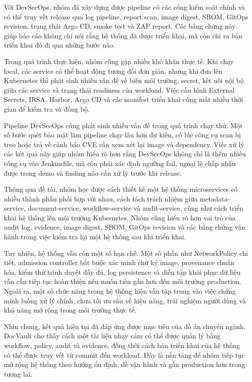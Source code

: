 Với DevSecOps, nhóm đã xây dựng được pipeline có các cổng kiểm soát chính và có thể truy vết release qua log pipeline, report scan, image digest, SBOM, GitOps revision, trạng thái Argo CD, smoke test và ZAP report. Các bằng chứng này giúp báo cáo không chỉ nói rằng hệ thống đã được triển khai, mà còn chỉ ra bản triển khai đó đi qua những bước nào.

Trong quá trình thực hiện, nhóm cũng gặp nhiều khó khăn thực tế. Khi chạy local, các service có thể hoạt động tương đối đơn giản, nhưng khi đưa lên Kubernetes thì phát sinh nhiều vấn đề về biến môi trường, secret, kết nối nội bộ giữa các service và trạng thái readiness của workload. Việc cấu hình External Secrets, IRSA, Harbor, Argo CD và các manifest triển khai cũng mất nhiều thời gian để kiểm tra và đồng bộ.

Pipeline DevSecOps cũng phát sinh nhiều vấn đề trong quá trình chạy thử. Một số bước quét bảo mật làm pipeline chạy lâu hơn dự kiến, có lúc công cụ scan bị treo hoặc trả về cảnh báo CVE cần xem xét lại image và dependency. Việc xử lý các kết quả này giúp nhóm hiểu rõ hơn rằng DevSecOps không chỉ là thêm nhiều công cụ vào Jenkinsfile, mà còn phải xác định ngưỡng fail, ngoại lệ chấp nhận được trong demo và finding nào cần xử lý trước khi release.

Thông qua đề tài, nhóm học được cách thiết kế một hệ thống microservices có nhiều thành phần phối hợp với nhau, cách tách trách nhiệm giữa metadata-service, document-service, workflow-service và audit-service, cũng như cách triển khai hệ thống lên môi trường Kubernetes. Nhóm cũng hiểu rõ hơn vai trò của audit log, evidence, image digest, SBOM, GitOps revision và các bằng chứng vận hành trong việc kiểm tra lại một hệ thống sau khi triển khai.

Tuy nhiên, hệ thống vẫn còn một số hạn chế. Một số phần như NetworkPolicy chi tiết, admission controller bắt buộc xác minh chữ ký image, provenance chuẩn hóa, kiểm thử trình duyệt đầy đủ, log persistence và diễn tập khôi phục dữ liệu vẫn cần tiếp tục hoàn thiện nếu muốn tiến gần hơn đến môi trường production. Ngoài ra, một số chức năng trong hệ thống hiện vẫn tập trung vào việc chứng minh luồng xử lý chính, chưa tối ưu sâu về hiệu năng, trải nghiệm người dùng và khả năng mở rộng trong môi trường thực tế.

Nhìn chung, kết quả hiện tại đã đáp ứng được mục tiêu của đồ án chuyên ngành. DocVault cho thấy cách một tài liệu nhạy cảm có thể được quản lý bằng workflow, policy, audit và evidence, đồng thời cách bản triển khai của hệ thống có thể được truy vết từ commit đến workload. Đây là nền tảng để nhóm tiếp tục mở rộng hệ thống theo hướng ổn định, dễ vận hành và gần production hơn trong tương lai.
